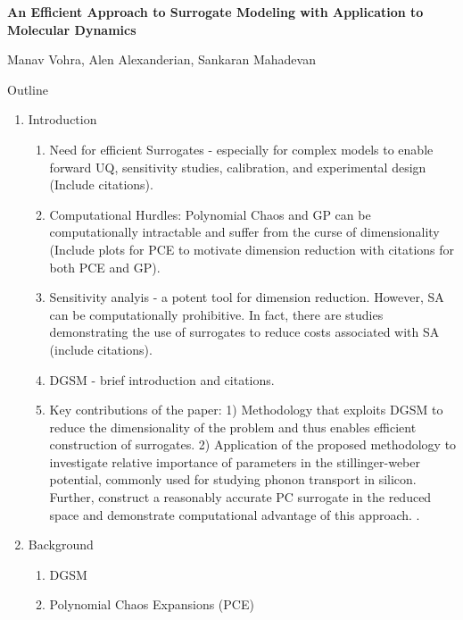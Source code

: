 \documentclass[letter,12pt]{article}
\begin{document}
\thispagestyle{empty}

\begin{center}
\begin{Large}
{\bf An Efficient Approach to Surrogate Modeling with Application to Molecular
Dynamics}\\
\end{Large}

\bigskip

Manav Vohra, Alen Alexanderian, Sankaran Mahadevan
\end{center}

\begin{large}
\noindent Outline
\end{large}

\begin{enumerate}

\item Introduction
\begin{enumerate}
\item Need for efficient Surrogates - especially for complex models to enable forward UQ, 
sensitivity studies, calibration, and experimental design (Include citations).
\item Computational Hurdles: Polynomial Chaos and GP can be computationally 
intractable and suffer from the curse of dimensionality (Include plots for PCE
to motivate dimension reduction with citations for both PCE and GP).
\item Sensitivity analyis - a potent tool for dimension reduction. However, SA can be
computationally prohibitive. In fact, there are studies demonstrating the use of 
surrogates to reduce costs associated with SA (include citations). 
\item DGSM - brief introduction and citations. 
\item Key contributions of the paper: 1) Methodology that exploits DGSM to reduce the
dimensionality of the problem and thus enables efficient construction of surrogates.
2) Application of the proposed methodology to investigate relative importance of
parameters in the stillinger-weber potential, commonly used for studying phonon transport in silicon. Further, construct a reasonably accurate PC surrogate in the reduced 
space and demonstrate computational advantage of this approach. .
\end{enumerate}

\item Background
\begin{enumerate}
\item DGSM
\item Polynomial Chaos Expansions (PCE)
\end{enumerate}


\end{enumerate}
\end{document}
